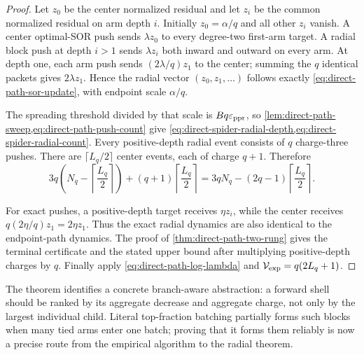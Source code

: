 \begin{proof}
Let $z_0$ be the center normalized residual and let $z_i$ be the common
normalized residual on arm depth $i$. Initially $z_0=\alpha/q$ and all other
$z_i$ vanish. A center optimal-SOR push sends $\lambda z_0$ to every
degree-two first-arm target. A radial block push at depth $i>1$ sends
$\lambda z_i$ both inward and outward on every arm. At depth one, each arm
push sends $(2\lambda/q)z_1$ to the center; summing the $q$ identical packets
gives $2\lambda z_1$. Hence the radial vector $(z_0,z_1,\ldots)$ follows
exactly \cref{eq:direct-path-sor-update}, with endpoint scale $\alpha/q$.

The spreading threshold divided by that scale is $Bq\varepsilon_{\mathrm{ppr}}$, so
\cref{lem:direct-path-sweep,eq:direct-path-push-count} give
\cref{eq:direct-spider-radial-depth,eq:direct-spider-radial-count}. Every
positive-depth radial event consists of $q$ charge-three pushes. There are
$\lceil L_q/2\rceil$ center events, each of charge $q+1$. Therefore
\begin{equation*}
 3q\left(N_q-\left\lceil\frac{L_q}{2}\right\rceil\right)
 +(q+1)\left\lceil\frac{L_q}{2}\right\rceil
 =3qN_q-(2q-1)\left\lceil\frac{L_q}{2}\right\rceil.
\end{equation*}

For exact pushes, a positive-depth target receives $\eta z_i$, while the
center receives $q(2\eta/q)z_1=2\eta z_1$. Thus the exact radial dynamics are
also identical to the endpoint-path dynamics. The proof of
\cref{thm:direct-path-two-rung} gives the terminal certificate and the stated
upper bound after multiplying positive-depth charges by $q$. Finally apply
\cref{eq:direct-path-log-lambda} and
$\mathcal V_{\rm exp}=q(2L_q+1)$.
\end{proof}

The theorem identifies a concrete branch-aware abstraction: a forward shell
should be ranked by its aggregate decrease and aggregate charge, not only by
the largest individual child. Literal top-fraction batching partially forms
such blocks when many tied arms enter one batch; proving that it forms them
reliably is now a precise route from the empirical algorithm to the radial
theorem.
